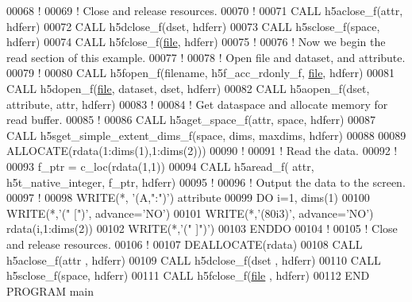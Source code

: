 \begin{DoxyCode}
00068   \textcolor{comment}{!}
00069   \textcolor{comment}{! Close and release resources.}
00070   \textcolor{comment}{!}
00071   \textcolor{keyword}{CALL }h5aclose\_f(attr, hdferr)
00072   \textcolor{keyword}{CALL }h5dclose\_f(dset, hdferr)
00073   \textcolor{keyword}{CALL }h5sclose\_f(space, hdferr)
00074   \textcolor{keyword}{CALL }h5fclose\_f(\hyperlink{structfile}{file}, hdferr)
00075   \textcolor{comment}{!}
00076   \textcolor{comment}{! Now we begin the read section of this example.}
00077   \textcolor{comment}{!}
00078   \textcolor{comment}{! Open file and dataset, and attribute.}
00079   \textcolor{comment}{!}
00080   \textcolor{keyword}{CALL }h5fopen\_f(filename, h5f\_acc\_rdonly\_f, \hyperlink{structfile}{file}, hdferr)
00081   \textcolor{keyword}{CALL }h5dopen\_f(\hyperlink{structfile}{file}, dataset, dset, hdferr)
00082   \textcolor{keyword}{CALL }h5aopen\_f(dset, attribute, attr, hdferr)
00083   \textcolor{comment}{!}
00084   \textcolor{comment}{! Get dataspace and allocate memory for read buffer.}
00085   \textcolor{comment}{!}
00086   \textcolor{keyword}{CALL }h5aget\_space\_f(attr, space, hdferr)
00087   \textcolor{keyword}{CALL }h5sget\_simple\_extent\_dims\_f(space, dims, maxdims, hdferr)
00088 
00089   \textcolor{keyword}{ALLOCATE}(rdata(1:dims(1),1:dims(2)))
00090   \textcolor{comment}{!}
00091   \textcolor{comment}{! Read the data.}
00092   \textcolor{comment}{!}
00093   f\_ptr = c\_loc(rdata(1,1))
00094   \textcolor{keyword}{CALL }h5aread\_f( attr, h5t\_native\_integer, f\_ptr, hdferr)
00095   \textcolor{comment}{!}
00096   \textcolor{comment}{! Output the data to the screen.}
00097   \textcolor{comment}{!}
00098   \textcolor{keyword}{WRITE}(*, \textcolor{stringliteral}{'(A,":")'}) attribute
00099   \textcolor{keywordflow}{DO} i=1, dims(1)
00100      \textcolor{keyword}{WRITE}(*,\textcolor{stringliteral}{'(" [")'}, advance=\textcolor{stringliteral}{'NO'})
00101      \textcolor{keyword}{WRITE}(*,\textcolor{stringliteral}{'(80i3)'}, advance=\textcolor{stringliteral}{'NO'}) rdata(i,1:dims(2))
00102      \textcolor{keyword}{WRITE}(*,\textcolor{stringliteral}{'(" ]")'})
00103 \textcolor{keywordflow}{  ENDDO}
00104   \textcolor{comment}{!}
00105   \textcolor{comment}{! Close and release resources.}
00106   \textcolor{comment}{!}
00107   \textcolor{keyword}{DEALLOCATE}(rdata)
00108   \textcolor{keyword}{CALL }h5aclose\_f(attr , hdferr)
00109   \textcolor{keyword}{CALL }h5dclose\_f(dset , hdferr)
00110   \textcolor{keyword}{CALL }h5sclose\_f(space, hdferr)
00111   \textcolor{keyword}{CALL }h5fclose\_f(\hyperlink{structfile}{file} , hdferr)
00112 \textcolor{keyword}{END PROGRAM }main
\end{DoxyCode}
